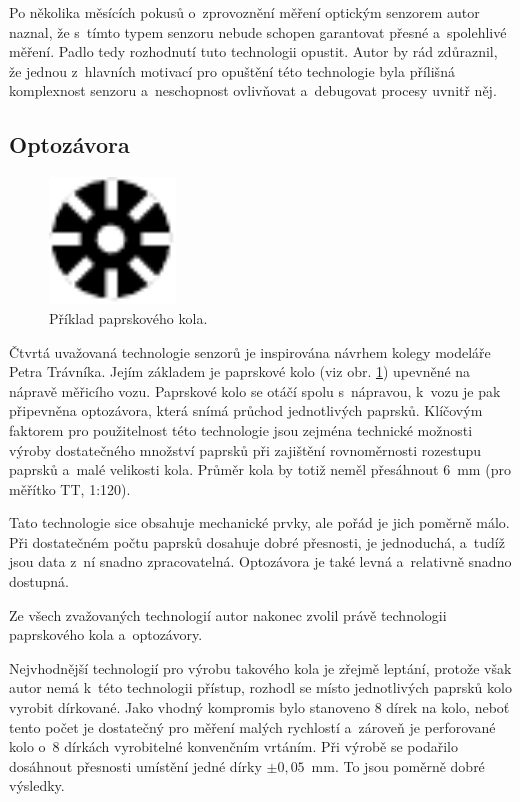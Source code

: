 Po několika měsících pokusů o~zprovoznění měření optickým senzorem autor naznal,
že s~tímto typem senzoru nebude schopen garantovat přesné a~spolehlivé měření.
Padlo tedy rozhodnutí tuto technologii opustit. Autor by rád zdůraznil, že
jednou z~hlavních motivací pro opuštění této technologie byla přílišná
komplexnost senzoru a~neschopnost ovlivňovat a~debugovat procesy uvnitř něj.

\subsection{Optozávora}
\label{subsec:wsm-senzor-optozavora}

\begin{figure}[ht]
\includegraphics[width=0.3\textwidth]{data/clonka.pdf}
\caption{Příklad paprskového kola.}
\label{fig:wheel}
\end{figure}

Čtvrtá uvažovaná technologie senzorů je inspirována návrhem kolegy modeláře
Petra Trávníka. Jejím základem je paprskové kolo (viz obr. \ref{fig:wheel})
upevněné na nápravě měřicího vozu. Paprskové kolo se otáčí spolu s~nápravou,
k~vozu je pak připevněna optozávora, která snímá průchod jednotlivých paprsků.
Klíčovým faktorem pro použitelnost této technologie jsou zejména technické
možnosti výroby dostatečného množství paprsků při zajištění rovnoměrnosti
rozestupu paprsků a~malé velikosti kola. Průměr kola by totiž neměl přesáhnout
$6$~mm (pro měřítko TT, 1:120).

Tato technologie sice obsahuje mechanické prvky, ale pořád je jich poměrně
málo. Při dostatečném počtu paprsků dosahuje dobré přesnosti, je jednoduchá,
a~tudíž jsou data z~ní snadno zpracovatelná. Optozávora je také levná
a~relativně snadno dostupná.

Ze všech zvažovaných technologií autor nakonec zvolil právě technologii
paprskového kola a~optozávory.

Nejvhodnější technologií pro výrobu takového kola je zřejmě leptání, protože
však autor nemá k~této technologii přístup, rozhodl se místo jednotlivých
paprsků kolo vyrobit dírkované. Jako vhodný kompromis bylo stanoveno
8 dírek na kolo, neboť tento počet je dostatečný pro měření malých rychlostí
a~zároveň je perforované kolo o~8 dírkách vyrobitelné konvenčním vrtáním. Při
výrobě se podařilo dosáhnout přesnosti umístění jedné dírky $\pm 0,05$~mm. To
jsou poměrně dobré výsledky.


